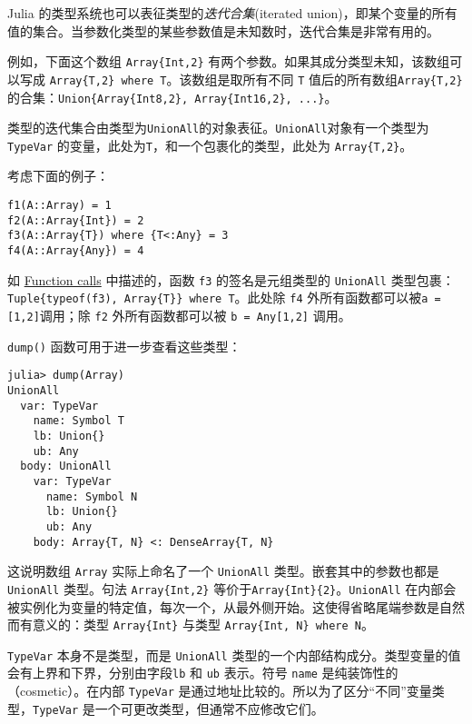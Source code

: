 Julia 的类型系统也可以表征类型的\emph{迭代合集}(iterated union)，即某个变量的所有值的集合。当参数化类型的某些参数值是未知数时，迭代合集是非常有用的。



例如，下面这个数组 \texttt{Array\{Int,2\}} 有两个参数。如果其成分类型未知，该数组可以写成 \texttt{Array\{T,2\} where T}。该数组是取所有不同 \texttt{T} 值后的所有数组\texttt{Array\{T,2\}} 的合集：\texttt{Union\{Array\{Int8,2\}, Array\{Int16,2\}, ...\}}。



类型的迭代集合由类型为\texttt{UnionAll}的对象表征。\texttt{UnionAll}对象有一个类型为 \texttt{TypeVar} 的变量，此处为\texttt{T}，和一个包裹化的类型，此处为 \texttt{Array\{T,2\}}。



考虑下面的例子：




\begin{verbatim}
f1(A::Array) = 1
f2(A::Array{Int}) = 2
f3(A::Array{T}) where {T<:Any} = 3
f4(A::Array{Any}) = 4
\end{verbatim}



如 \href{@ref}{Function calls} 中描述的，函数 \texttt{f3} 的签名是元组类型的 \texttt{UnionAll} 类型包裹：\texttt{Tuple\{typeof(f3), Array\{T\}\} where T}。此处除 \texttt{f4} 外所有函数都可以被\texttt{a = [1,2]}调用；除 \texttt{f2} 外所有函数都可以被 \texttt{b = Any[1,2]} 调用。



\texttt{dump()} 函数可用于进一步查看这些类型：




\begin{verbatim}
julia> dump(Array)
UnionAll
  var: TypeVar
    name: Symbol T
    lb: Union{}
    ub: Any
  body: UnionAll
    var: TypeVar
      name: Symbol N
      lb: Union{}
      ub: Any
    body: Array{T, N} <: DenseArray{T, N}
\end{verbatim}



这说明数组 \texttt{Array} 实际上命名了一个 \texttt{UnionAll} 类型。嵌套其中的参数也都是 \texttt{UnionAll} 类型。句法 \texttt{Array\{Int,2\}} 等价于\texttt{Array\{Int\}\{2\}}。\texttt{UnionAll} 在内部会被实例化为变量的特定值，每次一个，从最外侧开始。这使得省略尾端参数是自然而有意义的：类型 \texttt{Array\{Int\}} 与类型 \texttt{Array\{Int, N\} where N}。



\texttt{TypeVar} 本身不是类型，而是 \texttt{UnionAll} 类型的一个内部结构成分。类型变量的值会有上界和下界，分别由字段\texttt{lb} 和 \texttt{ub} 表示。符号 \texttt{name} 是纯装饰性的（cosmetic）。在内部 \texttt{TypeVar} 是通过地址比较的。所以为了区分“不同”变量类型，\texttt{TypeVar} 是一个可更改类型，但通常不应修改它们。




